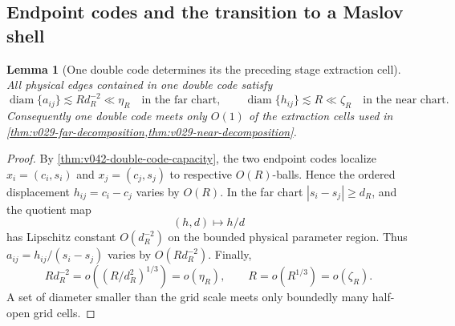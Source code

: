 \documentclass[10pt]{article}
\newtheorem{lemma}[theorem]{Lemma}
\begin{document}
\subsection{Endpoint codes and the transition to a Maslov shell}

\begin{lemma}[One double code determines its the preceding stage extraction cell]
\label{lem:v045-double-code-extraction-cell}
All physical edges contained in one double code satisfy
\begin{equation}
\label{eq:v045-double-code-extraction-localization}
\boxed{
\operatorname{diam}\{a_{ij}\}
\lesssim
Rd_R^{-2}
\ll
\eta_R
\quad\text{in the far chart},
\qquad
\operatorname{diam}\{h_{ij}\}
\lesssim
R
\ll
\zeta_R
\quad\text{in the near chart}.
}
\end{equation}
Consequently one double code meets only \(O(1)\) of the extraction cells used in
\cref{thm:v029-far-decomposition,thm:v029-near-decomposition}.
\end{lemma}

\begin{proof}
By \cref{thm:v042-double-code-capacity}, the two endpoint codes localize \(x_i=(c_i,s_i)\) and
\(x_j=(c_j,s_j)\) to respective \(O(R)\)-balls.  Hence the ordered displacement
\(h_{ij}=c_i-c_j\) varies by \(O(R)\).  In the far chart
\(|s_i-s_j|\ge d_R\), and the quotient map
\[
(h,d)\longmapsto h/d
\]
has Lipschitz constant \(O(d_R^{-2})\) on the bounded physical parameter region.  Thus
\(a_{ij}=h_{ij}/(s_i-s_j)\) varies by \(O(Rd_R^{-2})\).  Finally,
\[
Rd_R^{-2}
=o\!\left((R/d_R^2)^{1/3}\right)
=o(\eta_R),
\qquad
R=o(R^{1/3})=o(\zeta_R).
\]
A set of diameter smaller than the grid scale meets only boundedly many half-open grid cells.
\end{proof}
\end{document}
